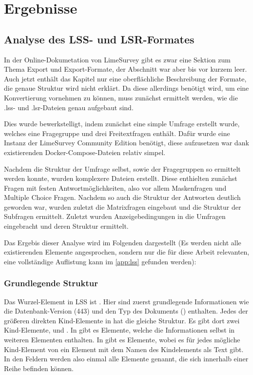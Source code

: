 \chapter{Ergebnisse}
\label{ch:ergebnisse}

\section{Analyse des LSS- und LSR-Formates}

In der Online-Dokumetation von LimeSurvey gibt es zwar eine Sektion zum Thema Export und Export-Formate, der Abschnitt war aber bis vor kurzem leer.
Auch jetzt enthält das Kapitel nur eine oberflächliche Beschreibung der Formate, die genaue Struktur wird nicht erklärt.
Da diese allerdings benötigt wird, um eine Konvertierung vornehmen zu können, muss zunächst ermittelt werden, wie die .lss- und .lsr-Dateien genau aufgebaut sind.

Dies wurde bewerkstelligt, indem zunächst eine simple Umfrage erstellt wurde, welches eine Fragegruppe und drei Freitextfragen enthält.
Dafür wurde eine Instanz der LimeSurvey Community Edition benötigt, diese aufzusetzen war dank existierenden Docker-Compose-Dateien relativ simpel.

Nachdem die Struktur der Umfrage selbst, sowie der Fragegruppen so ermittelt werden konnte, wurden komplexere Dateien erstellt.
Diese enthielten zunächst Fragen mit festen Antwortmöglichkeiten, also vor allem Maskenfragen und Multiple Choice Fragen.
Nachdem so auch die Struktur der Antworten deutlich geworden war, wurden zuletzt die Matrixfragen eingebaut und die Struktur der Subfragen ermittelt.
Zuletzt wurden Anzeigebedingungen in die Umfragen eingebracht und deren Struktur ermittelt.

Das Ergebis dieser Analyse wird im Folgenden dargestellt (Es werden nicht alle existierenden Elemente angesprochen, sondern nur die für diese Arbeit relevanten, eine vollständige Auflistung kann im \cref{app:lss} gefunden werden):

\subsection{Grundlegende Struktur}

Das Wurzel-Element in LSS ist .
Hier sind zuerst grundlegende Informationen wie die Datenbank-Version (443) und den Typ des Dokuments () enthalten.
Jedes der größeren direkten Kind-Elemente in  hat die gleiche Struktur.
Es gibt dort zwei Kind-Elemente,  und . In  gibt es  Elemente, welche die Informationen selbst in weiteren Elementen enthalten.
In  gibt es  Elemente, wobei es für jedes mögliche Kind-Element von  ein  Element mit dem Namen des Kindelements als Text gibt.
In den Feldern werden also einmal alle Elemente genannt, die sich innerhalb einer Reihe befinden können.

